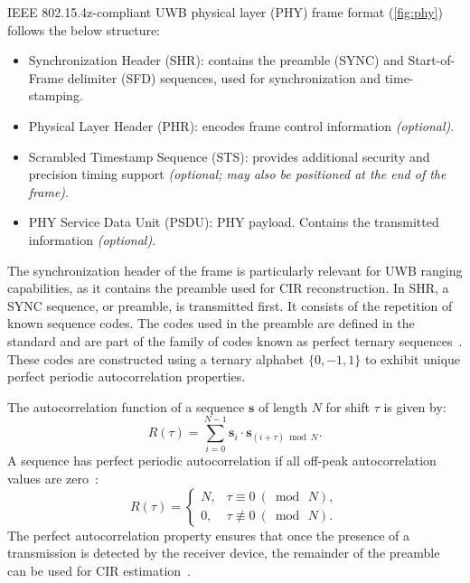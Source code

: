 IEEE 802.15.4z-compliant UWB physical layer (PHY) frame format (\autoref{fig:phy}) follows the below structure:

\begin{itemize} 
    \item Synchronization Header (SHR): contains the preamble (SYNC) and Start-of-Frame delimiter (SFD) sequences, used for synchronization and time-stamping. 
    \item Physical Layer Header (PHR): encodes frame control information \emph{(optional)}. 
    \item Scrambled Timestamp Sequence (STS): provides additional security and precision timing support \emph{(optional; may also be positioned at the end of the frame)}. 
    \item PHY Service Data Unit (PSDU): PHY payload. Contains the transmitted information \emph{(optional)}. 
\end{itemize}

The synchronization header of the frame is particularly relevant for UWB ranging capabilities, as it contains the preamble used for CIR reconstruction. In SHR, a SYNC sequence, or preamble, is transmitted first. It consists of the repetition of known sequence codes. The codes used in the preamble are defined in the standard and are part of the family of codes known as perfect ternary sequences~\cite{mcelroy2014comparison}. These codes are constructed using a ternary alphabet $\{0, -1, 1\}$ to exhibit unique perfect periodic autocorrelation properties. 

The autocorrelation function of a sequence $\bm s$ of length $N$ for shift $\tau$ is given by:
\begin{equation}
R(\tau) = \sum_{i=0}^{N-1} \bm s_i \cdot \bm s_{(i+\tau) \bmod N}.
\end{equation}
A sequence has perfect periodic autocorrelation if all off-peak autocorrelation values are zero~\cite{blake2014construction}:
\begin{equation}
R(\tau) =
\begin{cases}
    N, & \tau \equiv 0\ (\bmod\, N),\\
    0, & \tau \not\equiv 0\ (\bmod\, N).
\end{cases}
\end{equation}
The perfect autocorrelation property ensures that once the presence of a transmission is detected by the receiver device, the remainder of the preamble can be used for CIR estimation~\cite{mcelroy2014comparison}.

